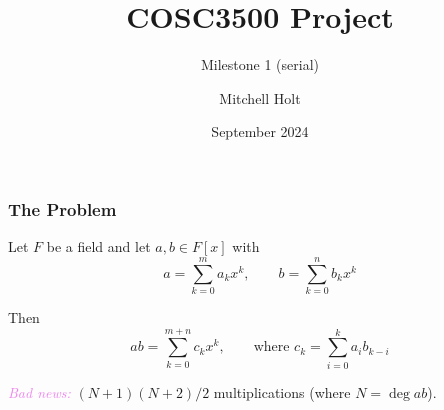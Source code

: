 \documentclass{beamer}
\title{COSC3500 Project}
\subtitle{Milestone 1 (serial)}
\author{Mitchell Holt}
\date{September 2024}
\newcommand{\its}[1]{\textcolor{violet}{\emph{#1}}}
\begin{document}

\begin{frame}
    \maketitle
\end{frame}

\begin{frame}
    \frametitle{The Problem}

    Let $F$ be a field and let $a,b \in F[x]$ with
    \begin{equation}
        a = \sum_{k = 0}^m a_k x^k, \qquad b = \sum_{k = 0}^n b_k x^k
    \end{equation}\pause \vfill

    Then
    \begin{equation}
        ab = \sum_{k = 0}^{m + n} c_k x^k,
            \qquad \text{where } c_k = \sum_{i = 0}^k a_i b_{k - i}
    \end{equation}
    

    \pause \vfill

    \its{Bad news:} $(N + 1)(N + 2)/2$ multiplications (where $N = \deg ab$).
\end{frame}
\end{document}
